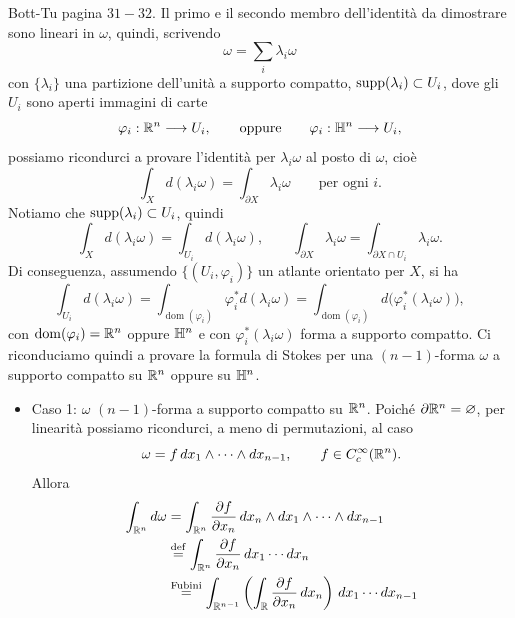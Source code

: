\documentclass[a4paper]{article}
\begin{document}
\begin{snippetproof}{Bott-Tu pagina \(31-32\).}
    Il primo e il secondo membro dell'identità da dimostrare sono lineari in \(\omega\), quindi, scrivendo
    \[
    \omega=\sum_i \lambda_i\omega
    \]
    con \(\{\lambda_i\}\) una partizione dell'unità a supporto compatto, \(\operatorname{supp}(\lambda_i)\subset U_i\), dove gli \(U_i\) sono aperti immagini di carte
    \[
    \varphi_i:\mathbb{R}^n\longrightarrow U_i,
    \qquad\text{oppure}\qquad
    \varphi_i:\mathbb{H}^n\longrightarrow U_i,
    \]
    possiamo ricondurci a provare l'identità per \(\lambda_i\omega\) al posto di \(\omega\), cioè
    \[
    \int_X d(\lambda_i\omega)=\int_{\partial X}\lambda_i\omega
    \qquad\text{per ogni }i.
    \]
    Notiamo che \(\operatorname{supp}(\lambda_i)\subset U_i\), quindi
    \[
    \int_X d(\lambda_i\omega)=\int_{U_i}d(\lambda_i\omega),
    \qquad
    \int_{\partial X}\lambda_i\omega=\int_{\partial X\cap U_i}\lambda_i\omega .
    \]
    Di conseguenza, assumendo \(\{(U_i,\varphi_i)\}\) un atlante orientato per \(X\), si ha
    \[
    \int_{U_i}d(\lambda_i\omega)
    =
    \int_{\operatorname{dom}(\varphi_i)}\varphi_i^*d(\lambda_i\omega)
    =
    \int_{\operatorname{dom}(\varphi_i)}d\bigl(\varphi_i^*(\lambda_i\omega)\bigr),
    \]
    con \(\operatorname{dom}(\varphi_i)=\mathbb{R}^n\) oppure \(\mathbb{H}^n\) e con \(\varphi_i^*(\lambda_i\omega)\) forma a supporto compatto. Ci riconduciamo quindi a provare la formula di Stokes per una \((n-1)\)-forma \(\omega\) a supporto compatto su \(\mathbb{R}^n\) oppure su \(\mathbb{H}^n\).
    \begin{itemize}
        \item Caso 1: \(\omega\) \((n-1)\)-forma a supporto compatto su \(\mathbb{R}^n\).
        Poiché \(\partial\mathbb{R}^n=\varnothing\), per linearità possiamo ricondurci, a meno di permutazioni, al caso
        \[
        \omega=f\,dx_1\wedge\cdots\wedge dx_{n-1},
        \qquad f\in C_c^\infty(\mathbb{R}^n).
        \]
        Allora
        \[
        \begin{aligned}
        \int_{\realnumbers^n}d\omega
        &=
        \int_{\realnumbers^n}\frac{\partial f}{\partial x_n}\,dx_n\wedge dx_1\wedge\cdots\wedge dx_{n-1} \\
        &\stackrel{\mathrm{def}}{=}
        \int_{\realnumbers^n}\frac{\partial f}{\partial x_n}\,dx_1\cdots dx_n \\
        &\stackrel{\text{Fubini}}{=}
        \int_{\realnumbers^{n-1}}\left(\int_{\realnumbers}\frac{\partial f}{\partial x_n}\,dx_n\right)
        \,dx_1\cdots dx_{n-1} \\

\end{aligned}\]
\end{itemize}
\end{snippetproof}
\end{document}
